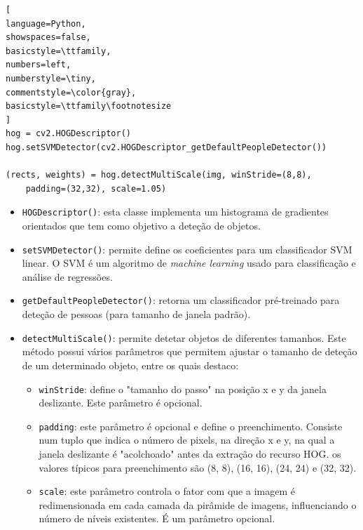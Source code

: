 \begin{lstlisting}[
language=Python,
showspaces=false,
basicstyle=\ttfamily,
numbers=left,
numberstyle=\tiny,
commentstyle=\color{gray},
basicstyle=\ttfamily\footnotesize
]
hog = cv2.HOGDescriptor()
hog.setSVMDetector(cv2.HOGDescriptor_getDefaultPeopleDetector())

(rects, weights) = hog.detectMultiScale(img, winStride=(8,8), 
	padding=(32,32), scale=1.05)
\end{lstlisting}
	

\begin{itemize}
	\item \texttt{HOGDescriptor()}: esta classe implementa um histograma de gradientes orientados\cite{Dalal} que tem como objetivo a deteção de objetos.
	
	\item \texttt{setSVMDetector()}: permite define os coeficientes para um  classificador \ac{SVM} linear. O \ac{SVM} é um algoritmo de \textit{machine learning} usado para classificação e análise de regressões. 
	
	
	\item \texttt{getDefaultPeopleDetector()}: retorna um classificador pré-treinado para deteção de pessoas (para tamanho de janela padrão)\cite{featuredetection}. 
	
	
	\item \texttt{detectMultiScale()}: permite detetar objetos de diferentes tamanhos. Este método possui vários parâmetros que permitem ajustar o tamanho de deteção de um determinado objeto, entre os quais destaco: 
	
\begin{itemize}
	\item \texttt{winStride}: define o "tamanho do passo" na posição x e y da janela deslizante. Este parâmetro é opcional.
	 
	\item \texttt{padding}: este parâmetro é opcional e define o preenchimento. Consiste num tuplo que indica o número de pixels, na direção x e y, na qual a janela deslizante é "acolchoado" antes da extração do recurso HOG. os valores típicos para preenchimento são (8, 8),  (16, 16), (24, 24) e (32, 32).
	
	\item \texttt{scale}: este parâmetro controla o fator com que a imagem é redimensionada em cada camada da pirâmide de imagens, influenciando o número de níveis existentes. É um parâmetro opcional. 



\end{itemize}
\end{itemize}
